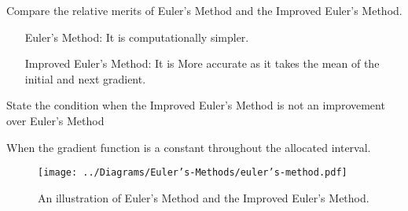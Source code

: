 \documentclass[oneside]{book}
\begin{document}
\begin{note}{}{}
  Compare the relative merits of Euler's Method and the Improved Euler's Method.
  \begin{enumerate}[wide=0pt, leftmargin=*]
    \item[Euler's Method:] It is computationally simpler.
    \item[Improved Euler's Method:] It is More accurate as it takes the mean of the initial and next gradient. 
  \end{enumerate}
\end{note}
\begin{note}
  State the condition when the Improved Euler's Method is not an improvement over Euler's Method
  \begin{center}
    When the gradient function is a constant throughout the allocated interval.
  \end{center} 
\end{note}
\begin{figure}[H]
  \centering
  \texttt{[image: ../Diagrams/Euler's-Methods/euler's-method.pdf]}
  \caption{An illustration of \textcolor{green!50!blue}{Euler's Method} and the \textcolor{green!85!black}{Improved Euler's Method}.}
  \label{fig:euler's-methods}
\end{figure}
\end{document}
